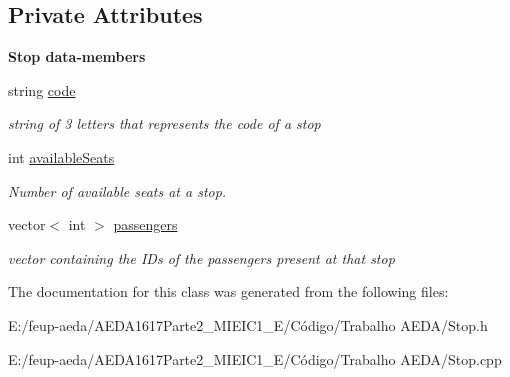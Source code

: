 \subsection*{Private Attributes}
\begin{Indent}\textbf{ Stop data-\/members}\par
\begin{DoxyCompactItemize}
\item 
string \hyperlink{group___stop_ga5a0dddd108225fd437be86eed7b3a3ef}{code}
\begin{DoxyCompactList}\small\item\em string of 3 letters that represents the code of a stop \end{DoxyCompactList}\item 
int \hyperlink{group___stop_ga459aba5bcfa17889d2f292f3f45528bc}{available\+Seats}
\begin{DoxyCompactList}\small\item\em Number of available seats at a stop. \end{DoxyCompactList}\item 
vector$<$ int $>$ \hyperlink{group___stop_ga2886c8f28932f3884ba3e4f741e7ec91}{passengers}
\begin{DoxyCompactList}\small\item\em vector containing the I\+Ds of the passengers present at that stop \end{DoxyCompactList}\end{DoxyCompactItemize}
\end{Indent}


The documentation for this class was generated from the following files\+:\begin{DoxyCompactItemize}
\item 
E\+:/feup-\/aeda/\+A\+E\+D\+A1617\+Parte2\+\_\+M\+I\+E\+I\+C1\+\_\+\+E/\+Código/\+Trabalho A\+E\+D\+A/Stop.\+h\item 
E\+:/feup-\/aeda/\+A\+E\+D\+A1617\+Parte2\+\_\+M\+I\+E\+I\+C1\+\_\+\+E/\+Código/\+Trabalho A\+E\+D\+A/Stop.\+cpp\end{DoxyCompactItemize}
